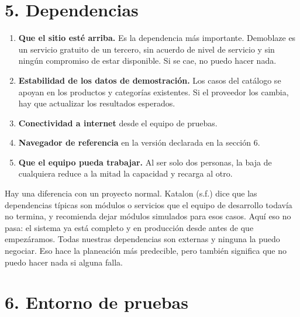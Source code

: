 \documentclass[11pt,a4paper]{article}
\begin{document}
\FloatBarrier
\section*{5. Dependencias}

\begin{enumerate}[label=D\arabic*.]
  \item \textbf{Que el sitio esté arriba.} Es la dependencia más importante.
        Demoblaze es un servicio gratuito de un tercero, sin acuerdo de nivel de
        servicio y sin ningún compromiso de estar disponible. Si se cae, no puedo
        hacer nada.
  \item \textbf{Estabilidad de los datos de demostración.} Los casos del catálogo
        se apoyan en los productos y categorías existentes. Si el proveedor los
        cambia, hay que actualizar los resultados esperados.
  \item \textbf{Conectividad a internet} desde el equipo de pruebas.
  \item \textbf{Navegador de referencia} en la versión declarada en la sección 6.
  \item \textbf{Que el equipo pueda trabajar.} Al ser solo dos personas, la baja
        de cualquiera reduce a la mitad la capacidad y recarga al otro.
\end{enumerate}

Hay una diferencia con un proyecto normal. Katalon (s.f.)
dice que las dependencias típicas son módulos o servicios que el equipo de
desarrollo todavía no termina, y recomienda dejar módulos simulados para esos casos.
Aquí eso no pasa: el sistema ya está completo y en producción desde antes de que
empezáramos. Todas nuestras dependencias son externas y ninguna la puedo negociar. Eso hace
la planeación más predecible, pero también significa que no puedo hacer nada si
alguna falla.

\FloatBarrier
\section*{6. Entorno de pruebas}
\end{document}
